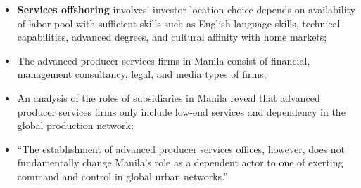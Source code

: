 \documentclass[a4paper, 10.5pt]{article} %
\begin{document}
\begin{itemize}
  \item \textbf{Services offshoring} involves: investor location choice depends on availability of labor pool with sufficient skills such as English language skills, technical capabilities, advanced degrees, and cultural affinity with home markets;
  \item The advanced producer services firms in Manila consist of financial, management consultancy, legal, and media types of firms;
  \item An analysis of the roles of subsidiaries in Manila reveal that advanced producer  services firms only include low-end services and dependency in the global production network;
  \item \enquote{The establishment of advanced producer services offices, however, does not fundamentally change Manila's role as a dependent actor to one of exerting command and control in global urban networks.}
\end{itemize}





\end{document}
